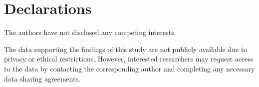 \documentclass[12pt]{article}
\numberwithin{equation}{section}
\begin{document}
 \fi
 \section*{Declarations}
 The authors have not disclosed any competing interests.

The data supporting the findings of this study are not publicly available due to privacy or ethical restrictions. However, interested researchers may request access to the data by contacting the corresponding author and completing any necessary data sharing agreements.

\end{document}
